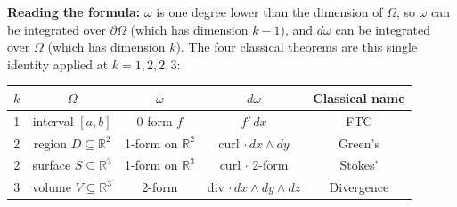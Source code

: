 \documentclass[11pt]{report}
\newcommand{\R}{\mathbb{R}}
\begin{document}
\textbf{Reading the formula:} $\omega$ is one degree lower than the dimension of $\Omega$, so $\omega$ can be integrated over $\partial \Omega$ (which has dimension $k-1$), and $d\omega$ can be integrated over $\Omega$ (which has dimension $k$). The four classical theorems are this single identity applied at $k = 1, 2, 2, 3$:

\begin{center}
\renewcommand{\arraystretch}{1.5}
\begin{tabular}{|c|c|c|c|c|}
\hline
\textbf{$k$} & \textbf{$\Omega$} & \textbf{$\omega$} & \textbf{$d\omega$} & \textbf{Classical name} \\
\hline
1 & interval $[a,b]$ & 0-form $f$ & $f'\,dx$ & FTC \\
\hline
2 & region $D \subseteq \R^2$ & 1-form on $\R^2$ & curl $\cdot\,dx \wedge dy$ & Green's \\
\hline
2 & surface $S \subseteq \R^3$ & 1-form on $\R^3$ & curl $\cdot$ 2-form & Stokes' \\
\hline
3 & volume $V \subseteq \R^3$ & 2-form & div $\cdot\,dx \wedge dy \wedge dz$ & Divergence \\
\hline
\end{tabular}
\end{center}
\end{document}
